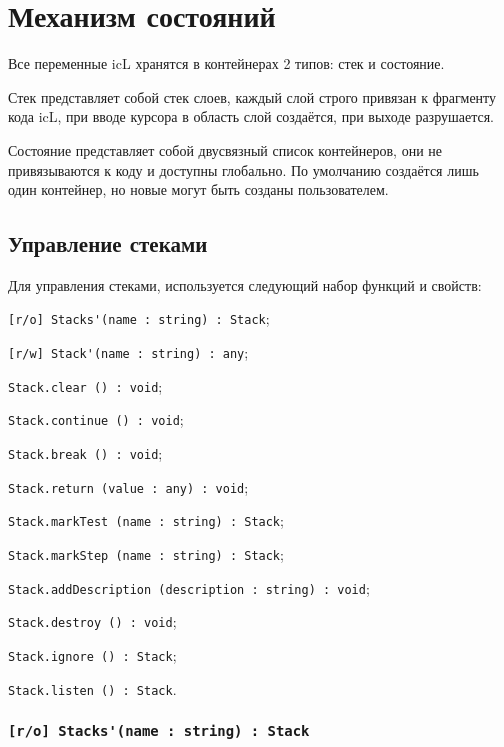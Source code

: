 \section{Механизм состояний}

Все переменные icL хранятся в контейнерах 2 типов: стек и состояние.

Стек представляет собой стек слоев, каждый слой строго привязан к фрагменту кода icL, при вводе курсора в область слой создаётся, при выходе разрушается.

Состояние представляет собой двусвязный список контейнеров, они не привязываются к коду и доступны глобально. По умолчанию создаётся лишь один контейнер, но новые могут быть созданы пользователем.

\subsection{Управление стеками}
\label{stack:control}

Для управления стеками, используется следующий набор функций и свойств:
\begin{icItems}
	\item \lstinline|[r/o] Stacks'(name : string) : Stack|;
	\item \lstinline|[r/w] Stack'(name : string) : any|;
	\item \lstinline|Stack.clear () : void|;
	\item \lstinline|Stack.continue () : void|;
	\item \lstinline|Stack.break () : void|;
	\item \lstinline|Stack.return (value : any) : void|;
	\item \lstinline|Stack.markTest (name : string) : Stack|;
	\item \lstinline|Stack.markStep (name : string) : Stack|;
	\item \lstinline|Stack.addDescription (description : string) : void|;
	\item \lstinline|Stack.destroy () : void|;
	\item \lstinline|Stack.ignore () : Stack|;
	\item \lstinline|Stack.listen () : Stack|.
\end{icItems}

\subsubsection{\lstinline|[r/o] Stacks'(name : string) : Stack|}

